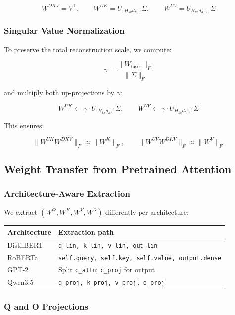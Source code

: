 \[
W^{DKV} = V^\top, \qquad
W^{UK} = U_{:H_{kv} d_h, :} \Sigma, \qquad
W^{UV} = U_{H_{kv} d_h:, :} \Sigma
\tag{4.4}
\]

\subsubsection{Singular Value Normalization}

To preserve the total reconstruction scale, we compute:

\[
\gamma = \frac{\|W_\text{fused}\|_F}{\|\Sigma\|_F}
\tag{4.5}
\]

and multiply both up-projections by $\gamma$:

\[
W^{UK} \leftarrow \gamma \cdot U_{:H_{kv} d_h, :} \Sigma, \qquad
W^{UV} \leftarrow \gamma \cdot U_{H_{kv} d_h:, :} \Sigma
\tag{4.6}
\]

This ensures:

\[
\|W^{UK} W^{DKV}\|_F \approx \|W^K\|_F, \qquad
\|W^{UV} W^{DKV}\|_F \approx \|W^V\|_F
\tag{4.7}
\]

\subsection{Weight Transfer from Pretrained Attention}

\subsubsection{Architecture-Aware Extraction}

We extract $(W^Q, W^K, W^V, W^O)$ differently per architecture:

\begin{table}[H]
\centering
\small
\begin{tabular}{ll}
\toprule
\textbf{Architecture} & \textbf{Extraction path} \\
\midrule
DistilBERT & \texttt{q\_lin, k\_lin, v\_lin, out\_lin} \\
RoBERTa & \texttt{self.query, self.key, self.value, output.dense} \\
GPT-2 & Split \texttt{c\_attn}; \texttt{c\_proj} for output \\
Qwen3.5 & \texttt{q\_proj, k\_proj, v\_proj, o\_proj} \\
\bottomrule
\end{tabular}
\end{table}

\subsubsection{Q and O Projections}

